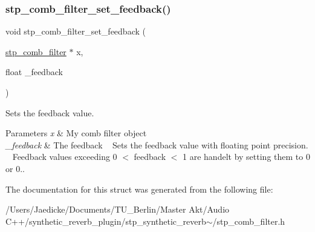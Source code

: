 \subsubsection{\texorpdfstring{stp\+\_\+comb\+\_\+filter\+\_\+set\+\_\+feedback()}{stp\_comb\_filter\_set\_feedback()}}
{\footnotesize\ttfamily void stp\+\_\+comb\+\_\+filter\+\_\+set\+\_\+feedback (\begin{DoxyParamCaption}\item[{\hyperlink{structstp__comb__filter}{stp\+\_\+comb\+\_\+filter} $\ast$}]{x,  }\item[{float}]{\+\_\+feedback }\end{DoxyParamCaption})\hspace{0.3cm}{\ttfamily [related]}}



Sets the feedback value. ~\newline
 


\begin{DoxyParams}{Parameters}
{\em x} & My comb filter object ~\newline
 \\
\hline
{\em \+\_\+feedback} & The feedback ~\newline
 Sets the feedback value with floating point precision. ~\newline
 Feedback values exceeding 0 $<$ feedback $<$ 1 are handelt by setting them to 0 or 0.. ~\newline
 \\
\hline
\end{DoxyParams}


The documentation for this struct was generated from the following file\+:\begin{DoxyCompactItemize}
\item 
/\+Users/\+Jaedicke/\+Documents/\+T\+U\+\_\+\+Berlin/\+Master Akt/\+Audio C++/synthetic\+\_\+reverb\+\_\+plugin/stp\+\_\+synthetic\+\_\+reverb$\sim$/stp\+\_\+comb\+\_\+filter.\+h\end{DoxyCompactItemize}
